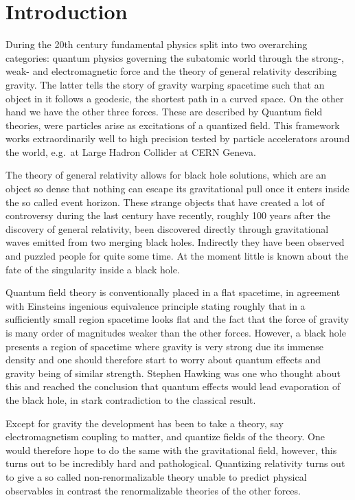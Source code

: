 \chapter{Introduction}
During the 20th century fundamental physics split into two overarching categories: quantum physics governing the subatomic world through the strong-, weak- and electromagnetic force and the theory of general relativity describing gravity. The latter tells the story of gravity warping spacetime such that an object in it follows a geodesic, the shortest path in a curved space. On the other hand we have the other three forces. These are described by Quantum field theories, were particles arise as excitations of a quantized field. This framework works extraordinarily well to high precision tested by particle accelerators around the world, e.g.\ at Large Hadron Collider at CERN Geneva.

The theory of general relativity allows for black hole solutions, which are an object so dense that nothing can escape its gravitational pull once it enters inside the so called event horizon. These strange objects that have created a lot of controversy during the last century have recently, roughly 100 years after the discovery of general relativity, been discovered directly through gravitational waves emitted from two merging black holes. Indirectly they have been observed and puzzled people for quite some time. At the moment little is known about the fate of the singularity inside a black hole.

Quantum field theory is conventionally placed in a flat spacetime, in agreement with Einsteins ingenious equivalence principle stating roughly that in a sufficiently small region spacetime looks flat and the fact that the force of gravity is many order of magnitudes weaker than the other forces. However, a black hole presents a region of spacetime where gravity is very strong due its immense density and one should therefore start to worry about quantum effects and gravity being of similar strength. Stephen Hawking was one who thought about this and reached the conclusion that quantum effects would lead evaporation of the black hole, in stark contradiction to the classical result.

Except for gravity the development has been to take a theory, say electromagnetism coupling to matter, and quantize fields of the theory. One would therefore hope to do the same with the gravitational field, however, this turns out to be incredibly hard and pathological. Quantizing relativity turns out to give a so called non-renormalizable theory unable to predict physical observables in contrast the renormalizable theories of the other forces. 


